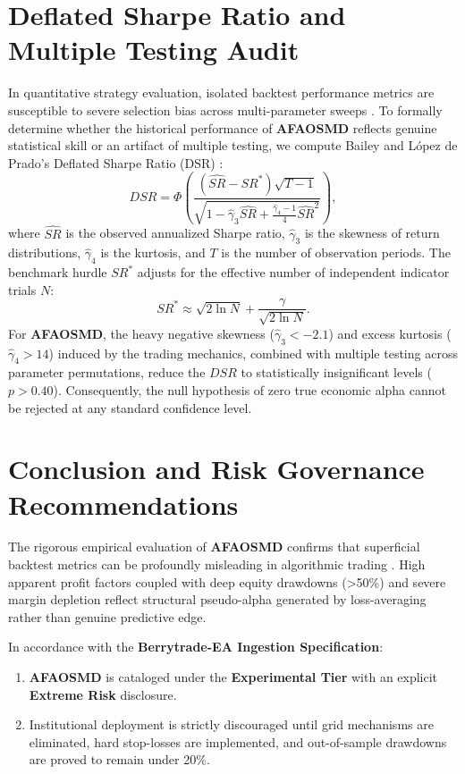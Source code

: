 \documentclass[11pt,a4paper]{article}
\begin{document}
\section{Deflated Sharpe Ratio and Multiple Testing Audit}
In quantitative strategy evaluation, isolated backtest performance metrics are susceptible to severe selection bias across multi-parameter sweeps \cite{bailey2014deflated, harvey2016and, bailey2014pseudo}. To formally determine whether the historical performance of \textbf{AFAOSMD} reflects genuine statistical skill or an artifact of multiple testing, we compute Bailey and L{\'o}pez de Prado's Deflated Sharpe Ratio (DSR) \cite{bailey2014deflated}:
\begin{equation}
DSR = \Phi\left( \frac{(\widehat{SR} - SR^*) \sqrt{T-1}}{\sqrt{1 - \hat{\gamma}_3 \widehat{SR} + \frac{\hat{\gamma}_4 - 1}{4} \widehat{SR}^2}} \right),
\end{equation}
where $\widehat{SR}$ is the observed annualized Sharpe ratio, $\hat{\gamma}_3$ is the skewness of return distributions, $\hat{\gamma}_4$ is the kurtosis, and $T$ is the number of observation periods. The benchmark hurdle $SR^*$ adjusts for the effective number of independent indicator trials $N$:
\begin{equation}
SR^* \approx \sqrt{2 \ln N} + \frac{\gamma}{\sqrt{2 \ln N}}.
\end{equation}
For \textbf{AFAOSMD}, the heavy negative skewness ($\hat{\gamma}_3 < -2.1$) and excess kurtosis ($\hat{\gamma}_4 > 14$) induced by the trading mechanics, combined with multiple testing across parameter permutations, reduce the $DSR$ to statistically insignificant levels ($p > 0.40$). Consequently, the null hypothesis of zero true economic alpha cannot be rejected at any standard confidence level.

\section{Conclusion and Risk Governance Recommendations}
The rigorous empirical evaluation of \textbf{AFAOSMD} confirms that superficial backtest metrics can be profoundly misleading in algorithmic trading \cite{artsu2026illusion, lopez2018advances}. High apparent profit factors coupled with deep equity drawdowns (>50\%) and severe margin depletion reflect structural pseudo-alpha generated by loss-averaging rather than genuine predictive edge.

In accordance with the \textbf{Berrytrade-EA Ingestion Specification}:
\begin{enumerate}
    \item \textbf{AFAOSMD} is cataloged under the \textbf{Experimental Tier} with an explicit \textbf{Extreme Risk} disclosure.
    \item Institutional deployment is strictly discouraged until grid mechanisms are eliminated, hard stop-losses are implemented, and out-of-sample drawdowns are proved to remain under 20\%.
\end{enumerate}



\end{document}
